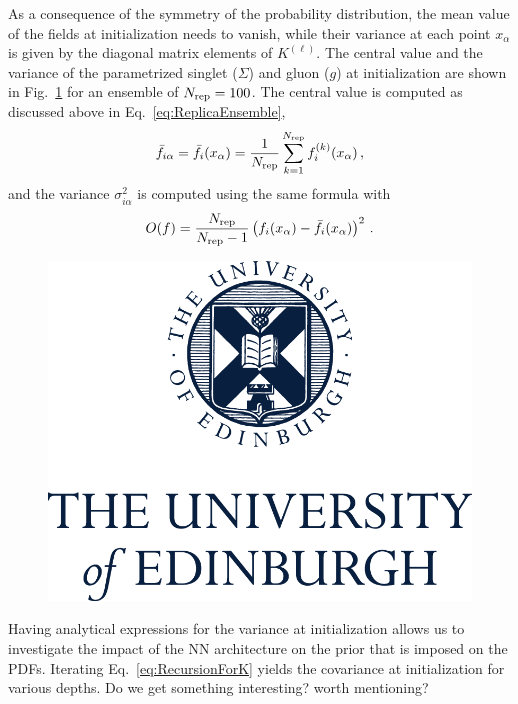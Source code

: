 As a consequence of the symmetry of the probability distribution, the mean value of the fields at
initialization needs to vanish, while their variance at each point $x_\alpha$ is given by the
diagonal matrix elements of $K^{(\ell)}$. The central value and the variance of the
parametrized singlet ($\Sigma$) and gluon ($g$) at initialization are shown in
Fig.~\ref{fig:SingletGluonInit} for an ensemble of $N_{\rm rep}=100$. The central value is computed as
discussed above in Eq.~\eqref{eq:ReplicaEnsemble},
\begin{align}
    \label{eq:MeanValAtInit}
    \bar{f}_{i\alpha} = \bar{f}_{i}(x_\alpha) = \frac{1}{N_{\rm rep}} \sum_{k=1}^{N_{\rm rep}} f^{(k)}_i(x_\alpha)\, ,
\end{align}
and the variance $\sigma^2_{i\alpha}$ is computed using the same formula with
\begin{align}
    \label{eq:VarAtInit}
    O(f) = \frac{N_{\rm rep}}{N_{\rm rep}-1} \left(f_i(x_\alpha) - \bar{f}_{i}(x_\alpha)\right)^2\, .
\end{align}

\begin{figure}
    \centering
    \includegraphics[scale=0.5]{plots/UoECentredLogo282v1160215.png}
    \caption{}        
    \label{fig:SingletGluonInit} 
\end{figure}


Having analytical expressions for the variance at initialization allows us to investigate the
impact of the NN architecture on the prior that is imposed on the PDFs. Iterating
Eq.~\eqref{eq:RecursionForK} yields the covariance at initialization for various depths.
Do we get something interesting? worth mentioning?


\FloatBarrier
